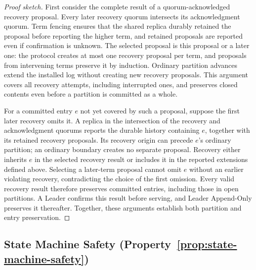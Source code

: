 \begin{proof}[Proof sketch]
First consider the complete result of a quorum-acknowledged recovery proposal.
Every later recovery quorum intersects its acknowledgment quorum. Term
fencing ensures that the shared replica durably retained the proposal before
reporting the higher term, and retained proposals are reported even if
confirmation is unknown. The selected proposal is this proposal or a
later one: the protocol creates at most one recovery proposal per term,
and proposals from intervening terms preserve it by induction. Ordinary
partition advances extend the installed log without creating new recovery
proposals. This argument covers all
recovery attempts, including interrupted ones, and preserves closed
contents even before a partition is committed as a whole.

For a committed entry $e$ not yet covered by such a proposal, suppose the
first later recovery omits it. A replica in the intersection of the
recovery and acknowledgment quorums reports the durable history containing
$e$, together with its retained recovery proposals. Its recovery origin
can precede $e$'s ordinary partition; an ordinary boundary creates no
separate proposal.
Recovery either inherits $e$ in the selected recovery result or includes it
in the reported extensions defined above. Selecting a later-term proposal cannot
omit $e$ without an earlier violating recovery, contradicting the choice
of the first omission. Every valid recovery result therefore preserves
committed entries, including those in open partitions. A Leader confirms
this result before serving, and Leader Append-Only preserves it thereafter.
Together, these arguments establish both partition and entry preservation.
\end{proof}

\subsection{State Machine Safety (Property~\ref{prop:state-machine-safety})}
\label{subsec:proof-state-machine-safety}

